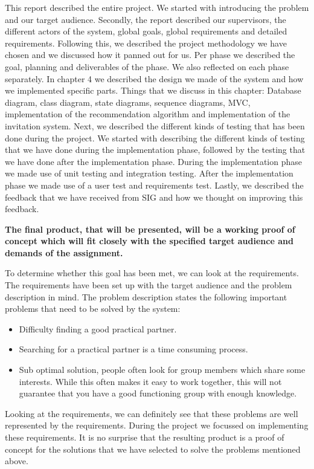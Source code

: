This report described the entire project.
We started with introducing the problem and our target audience.
Secondly, the report described our supervisors, the different actors of the system, global goals, global requirements and detailed requirements.
Following this, we described the project methodology we have chosen and we discussed how it panned out for us.
Per phase we described the goal, planning and deliverables of the phase.
We also reflected on each phase separately.
In chapter 4 we described the design we made of the system and how we implemented specific parts.
Things that we discuss in this chapter: Database diagram, class diagram, state diagrams, sequence diagrams, MVC, implementation of the recommendation algorithm and implementation of the invitation system.
Next, we described the different kinds of testing that has been done during the project.
We started with describing the different kinds of testing that we have done during the implementation phase, followed by the testing that we have done after the implementation phase.
During the implementation phase we made use of unit testing and integration testing.
After the implementation phase we made use of a user test and requirements test.
Lastly, we described the feedback that we have received from SIG and how we thought on improving this feedback.

\textbf{The final product, that will be presented, will be a working proof of concept which will fit closely with the specified target audience and demands of the assignment.}

To determine whether this goal has been met, we can look at the requirements.
The requirements have been set up with the target audience and the problem description in mind.
The problem description states the following important problems that need to be solved by the system:
\begin{itemize}
\item Difficulty finding a good practical partner.
\item Searching for a practical partner is a time consuming process.
\item Sub optimal solution, people often look for group members which share some interests.
While this often makes it easy to work together, this will not guarantee that you have a good functioning group with enough knowledge.
\end{itemize}

Looking at the requirements, we can definitely see that these problems are well represented by the requirements.
During the project we focussed on implementing these requirements.
It is no surprise that the resulting product is a proof of concept for the solutions that we have selected to solve the problems mentioned above.

